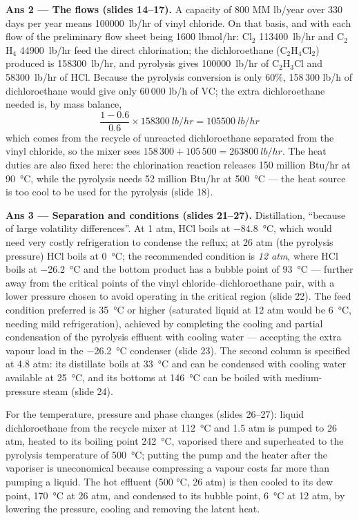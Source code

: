 \documentclass[10pt,a4paper]{article}
\begin{document}
\begin{ansbox}
\textbf{Ans 2 --- The flows (slides 14--17).} A capacity of 800 MM lb/year over 330 days per year means \SI{100000}{lb/hr} of vinyl chloride. On that basis, and with each flow of the preliminary flow sheet being 1600 lbmol/hr: Cl$_2$ \SI{113400}{lb/hr} and C$_2$H$_4$ \SI{44900}{lb/hr} feed the direct chlorination; the dichloroethane (C$_2$H$_4$Cl$_2$) produced is \SI{158300}{lb/hr}, and pyrolysis gives \SI{100000}{lb/hr} of C$_2$H$_3$Cl and \SI{58300}{lb/hr} of HCl. Because the pyrolysis conversion is only 60\%, 158\,300 lb/h of dichloroethane would give only 60\,000 lb/h of VC; the extra dichloroethane needed is, by mass balance,
\[\frac{1-0.6}{0.6}\times \SI{158300}{lb/hr}=\SI{105500}{lb/hr}\]
which comes from the recycle of unreacted dichloroethane separated from the vinyl chloride, so the mixer sees $158\,300+105\,500=\SI{263800}{lb/hr}$. The heat duties are also fixed here: the chlorination reaction releases 150 million Btu/hr at \SI{90}{\celsius}, while the pyrolysis needs 52 million Btu/hr at \SI{500}{\celsius} --- the heat source is too cool to be used for the pyrolysis (slide 18).

\textbf{Ans 3 --- Separation and conditions (slides 21--27).} Distillation, ``because of large volatility differences''. At 1 atm, HCl boils at \SI{-84.8}{\celsius}, which would need very costly refrigeration to condense the reflux; at 26 atm (the pyrolysis pressure) HCl boils at \SI{0}{\celsius}; the recommended condition is \emph{12 atm}, where HCl boils at \SI{-26.2}{\celsius} and the bottom product has a bubble point of \SI{93}{\celsius} --- further away from the critical points of the vinyl chloride--dichloroethane pair, with a lower pressure chosen to avoid operating in the critical region (slide 22). The feed condition preferred is \SI{35}{\celsius} or higher (saturated liquid at 12 atm would be \SI{6}{\celsius}, needing mild refrigeration), achieved by completing the cooling and partial condensation of the pyrolysis effluent with cooling water --- accepting the extra vapour load in the \SI{-26.2}{\celsius} condenser (slide 23). The second column is specified at 4.8 atm: its distillate boils at \SI{33}{\celsius} and can be condensed with cooling water available at \SI{25}{\celsius}, and its bottoms at \SI{146}{\celsius} can be boiled with medium-pressure steam (slide 24).

For the temperature, pressure and phase changes (slides 26--27): liquid dichloroethane from the recycle mixer at \SI{112}{\celsius} and 1.5 atm is pumped to 26 atm, heated to its boiling point \SI{242}{\celsius}, vaporised there and superheated to the pyrolysis temperature of \SI{500}{\celsius}; putting the pump and the heater after the vaporiser is uneconomical because compressing a vapour costs far more than pumping a liquid. The hot effluent (500 \si{\celsius}, 26 atm) is then cooled to its dew point, \SI{170}{\celsius} at 26 atm, and condensed to its bubble point, \SI{6}{\celsius} at 12 atm, by lowering the pressure, cooling and removing the latent heat.
\end{ansbox}
\end{document}
